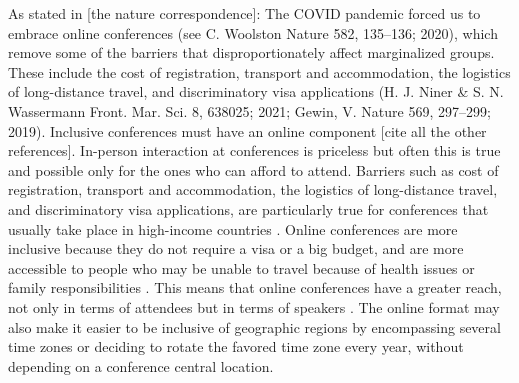 \documentclass[10pt,letterpaper]{article}
\begin{document}
As stated in [the nature correspondence]: The COVID pandemic forced us to embrace online conferences (see C. Woolston Nature 582, 135–136; 2020), which remove some of the barriers that disproportionately affect marginalized groups. These include the cost of registration, transport and accommodation, the logistics of long-distance travel, and discriminatory visa applications (H. J. Niner \& S. N. Wassermann Front. Mar. Sci. 8, 638025; 2021; Gewin, V. Nature 569, 297–299; 2019). Inclusive conferences must have an online component [cite all the other references].
In-person interaction at conferences is priceless but often this is true and possible only for the ones who can afford to attend. 
Barriers such as cost of registration, transport and accommodation, the logistics of long-distance travel, and discriminatory visa applications, are particularly true for conferences that usually take place in high-income countries \cite{arendDisparityConferenceRegistration2019,gewinWhatScientistsShould2019,jooKeepOnlineOption2021}. 
Online conferences are more inclusive because they do not require a visa or a big budget, and are more accessible to people who may be unable to travel because of health issues or family responsibilities \cite{salibaGettingGripsOnline2020}.
This means that online conferences have a greater reach, not only in terms of attendees but in terms of speakers  \cite{atkinsonJournalMedicine20202021, roosOnlineConferencesNew2020, jooKeepOnlineOption2021}.
The online format may also make it easier to be inclusive of geographic regions by encompassing several time zones or deciding to rotate the favored time zone every year, without depending on a conference central location. 
\end{document}
